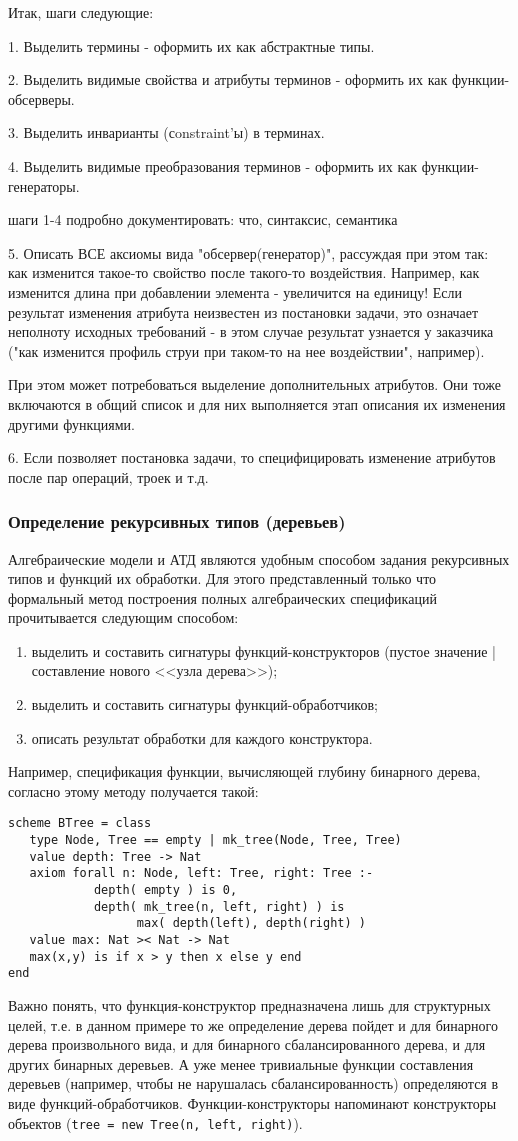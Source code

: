 \documentclass[14pt]{extreport}
\newcommand{\head}[1]{\vspace{1cm}\subsubsection{#1}}
\begin{document}
Итак, шаги следующие:

1. Выделить термины - оформить их как абстрактные типы.

2. Выделить видимые свойства и атрибуты терминов - оформить их как функции-обсерверы.

3. Выделить инварианты (сonstraint'ы) в терминах.

4. Выделить видимые преобразования терминов - оформить их как функции-генераторы.

шаги 1-4 подробно документировать: что, синтаксис, семантика

5. Описать ВСЕ аксиомы вида "обсервер(генератор)", рассуждая при этом так: как изменится такое-то свойство после такого-то воздействия. Например, как изменится длина при добавлении элемента - увеличится на единицу! Если результат изменения атрибута неизвестен из постановки задачи, это означает неполноту исходных требований - в этом случае результат узнается у заказчика ("как изменится профиль струи при таком-то на нее воздействии", например).

При этом может потребоваться выделение дополнительных атрибутов. Они тоже включаются в общий список и для них выполняется этап описания их изменения другими функциями.

6. Если позволяет постановка задачи, то специфицировать изменение атрибутов после пар операций, троек и т.д. 


\head{Определение рекурсивных типов (деревьев)}
Алгебраические модели и АТД являются удобным способом задания рекурсивных типов и функций их обработки. Для этого представленный только что формальный метод построения полных алгебраических спецификаций прочитывается следующим способом:
\begin{enumerate}
  \item выделить и составить сигнатуры функций-конструкторов (пустое значение | составление нового <<узла дерева>>);
  \item выделить и составить сигнатуры функций-обработчиков;
  \item описать результат обработки для каждого конструктора.
\end{enumerate}
Например, спецификация функции, вычисляющей глубину бинарного дерева, согласно этому методу получается такой:
\begin{lstlisting}
scheme BTree = class
   type Node, Tree == empty | mk_tree(Node, Tree, Tree)
   value depth: Tree -> Nat
   axiom forall n: Node, left: Tree, right: Tree :-
            depth( empty ) is 0,
            depth( mk_tree(n, left, right) ) is
                  max( depth(left), depth(right) )
   value max: Nat >< Nat -> Nat
   max(x,y) is if x > y then x else y end
end
\end{lstlisting}
Важно понять, что функция-конструктор предназначена лишь для структурных целей, т.е. в данном примере то же определение дерева пойдет и для бинарного дерева произвольного вида, и для бинарного сбалансированного дерева, и для других бинарных деревьев. А уже менее тривиальные функции составления деревьев (например, чтобы не нарушалась сбалансированность) определяются в виде функций-обработчиков. Функции-конструкторы напоминают конструкторы объектов (\texttt{tree = new Tree(n, left, right)}).
\end{document}
